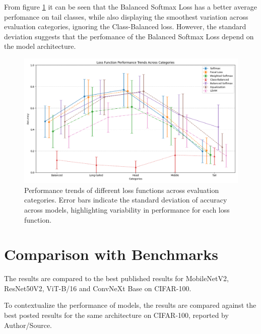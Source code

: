 From figure \ref{fig:loss_comparison} it can be seen that the Balanced Softmax Loss has a better average perfomance on tail classes, while also displaying the smoothest variation across evaluation categories, ignoring the Class-Balanced loss. However, the standard deviation suggests that the perfomance of the Balanced Softmax Loss depend on the model architecture.

\begin{figure}[h!]
    \centering
    \includegraphics[width=\textwidth]{Images/Plots/loss_comparison.png}
    \caption{Performance trends of different loss functions across evaluation categories. Error bars indicate the standard deviation of accuracy across models, highlighting variability in performance for each loss function.}
    \label{fig:loss_comparison}
\end{figure}


\section{Comparison with Benchmarks}
The results are compared to the best published results for MobileNetV2, ResNet50V2, ViT-B/16 and ConvNeXt Base on CIFAR-100.

To contextualize the performance of models, the results are compared against the best posted results for the same architecture on CIFAR-100, reported by Author/Source.



